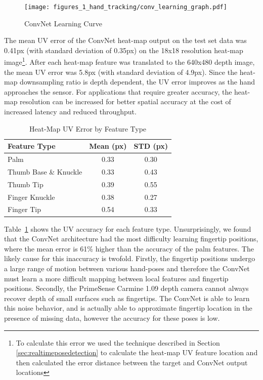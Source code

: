 \begin{figure}[ht]
\centering
\texttt{[image: figures\_1\_hand\_tracking/conv\_learning\_graph.pdf]}
    \caption{ConvNet Learning Curve}
    \label{fig:conv_learning_graph}
\end{figure}

The mean UV error of the ConvNet heat-map output on the test set data was 0.41px (with standard deviation of 0.35px) on the 18x18 resolution heat-map image\footnote{To calculate this error we used the technique described in Section \ref{sec:realtimeposedetection} to calculate the heat-map UV feature location and then calculated the error distance between the target and ConvNet output locations}. After each heat-map feature was translated to the 640x480 depth image, the mean UV error was 5.8px (with standard deviation of 4.9px). Since the heat-map downsampling ratio is depth dependent, the UV error improves as the hand approaches the sensor. For applications that require greater accuracy, the heat-map resolution can be increased for better spatial accuracy at the cost of increased latency and reduced throughput.

\begin{table}[h]
\small
\centering
\begin{tabular}{lcc}
        \hline
        Feature Type           & Mean (px) & STD (px) \\
        \hline
        Palm                   & 0.33       & 0.30      \\
        Thumb Base \& Knuckle  & 0.33       & 0.43      \\
        Thumb Tip              & 0.39       & 0.55      \\
        Finger Knuckle         & 0.38       & 0.27      \\
        Finger Tip             & 0.54       & 0.33      \\
        \hline
    \end{tabular}
\caption{Heat-Map UV Error by Feature Type}
\label{tab:uv_errors}
\end{table}

Table~\ref{tab:uv_errors} shows the UV accuracy for each feature type. Unsurprisingly, we found that the ConvNet architecture had the most difficulty learning fingertip positions, where the mean error is 61\% higher than the accuracy of the palm features. The likely cause for this inaccuracy is twofold. Firstly, the fingertip positions undergo a large range of motion between various hand-poses and therefore the ConvNet must learn a more difficult mapping between local features and fingertip positions. Secondly, the PrimeSense Carmine 1.09 depth camera cannot always recover depth of small surfaces such as fingertips. The ConvNet is able to learn this noise behavior, and is actually able to approximate fingertip location in the presence of missing data, however the accuracy for these poses is low.

